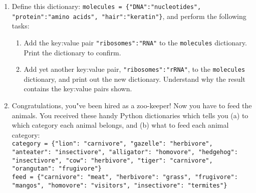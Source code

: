 \documentclass{article}[12pt]
\newcommand{\code}[1]{\texttt{#1}}  %
\begin{document}
\begin{enumerate}
    \item Define this dictionary: \code{molecules = \{"DNA":"nucleotides", "protein":"amino acids", "hair":"keratin"\}}, and perform the following tasks:
    
    \begin{enumerate}
        \item Add the key:value pair \code{"ribosomes":"RNA"} to the \code{molecules} dictionary. Print the dictionary to confirm.
        \item Add yet another key:value pair, \code{"ribosomes":"rRNA"}, to the \code{molecules} dictionary, and print out the new dictionary. Understand why the result contains the key:value pairs shown.
    \end{enumerate}
	
\item Congratulations, you"ve been hired as a zoo-keeper! Now you have to feed the animals. You received these handy Python dictionaries which tells you (a) to which category each animal belongs, and (b) what to feed each animal category: \\
	
	\code{category = \{"lion": "carnivore", "gazelle": "herbivore", "anteater": "insectivore", "alligator": "homovore", "hedgehog": "insectivore", "cow": "herbivore", "tiger": "carnivore", "orangutan": "frugivore"\}} \\
	
	\code{feed = \{"carnivore": "meat", "herbivore": "grass", "frugivore": "mangos", "homovore": "visitors", "insectivore": "termites"\} } \\
	

\end{enumerate}
\end{document}
